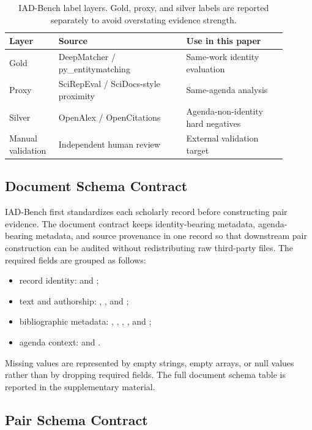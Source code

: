 \documentclass[11pt]{article}
\begin{document}
\begin{table}[H]
\caption{IAD-Bench label layers. Gold, proxy, and silver labels are reported separately to avoid overstating evidence strength.}
\label{tab:label-layers}
\centering
\footnotesize
\setlength{\tabcolsep}{3pt}
\begin{tabular}{L{0.15\linewidth}L{0.42\linewidth}L{0.33\linewidth}}
\toprule
Layer & Source & Use in this paper \\
\midrule
Gold & DeepMatcher / py\_entitymatching & Same-work identity evaluation \\
Proxy & SciRepEval / SciDocs-style proximity & Same-agenda analysis \\
Silver & OpenAlex / OpenCitations & Agenda-non-identity hard negatives \\
Manual validation & Independent human review & External validation target \\
\bottomrule
\end{tabular}
\end{table}

\subsection{Document Schema Contract}

IAD-Bench first standardizes each scholarly record before constructing pair evidence. The document contract keeps identity-bearing metadata, agenda-bearing metadata, and source provenance in one record so that downstream pair construction can be audited without redistributing raw third-party files. The required fields are grouped as follows:
\begin{itemize}
\setlength{\itemsep}{0pt}
\item record identity:  and ;
\item text and authorship: , , and ;
\item bibliographic metadata: , , , , and ;
\item agenda context:  and .
\end{itemize}
Missing values are represented by empty strings, empty arrays, or null values rather than by dropping required fields. The full document schema table is reported in the supplementary material.

\subsection{Pair Schema Contract}
\end{document}
